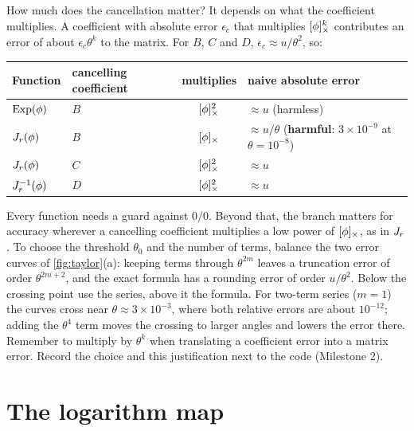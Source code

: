 How much does the cancellation matter? It depends on what the coefficient multiplies. A coefficient
with absolute error $\epsilon_c$ that multiplies $[\phi]_{\times}^k$ contributes an error of about
$\epsilon_c\theta^k$ to the matrix. For $B$, $C$ and $D$, $\epsilon_c \approx u/\theta^2$, so:
\begin{center}\small
\begin{tabular}{@{}l l c l@{}}
\toprule
Function & cancelling coefficient & multiplies & naive absolute error \\
\midrule
$\operatorname{Exp}(\phi)$ & $B$ & $[\phi]_{\times}^2$ & $\approx u$ \quad (harmless) \\
$J_r(\phi)$ & $B$ & $[\phi]_{\times}$ & $\approx u/\theta$ \quad (\textbf{harmful}: $3\times10^{-9}$ at $\theta = 10^{-8}$) \\
$J_r(\phi)$ & $C$ & $[\phi]_{\times}^2$ & $\approx u$ \\
$J_r^{-1}(\phi)$ & $D$ & $[\phi]_{\times}^2$ & $\approx u$ \\
\bottomrule
\end{tabular}
\end{center}

\begin{keyidea}
Every function needs a guard against $0/0$. Beyond that, the branch matters for accuracy wherever a
cancelling coefficient multiplies a low power of $[\phi]_{\times}$, as in $J_r$. To choose the threshold
$\theta_0$ and the number of terms, balance the two error curves of \cref{fig:taylor}(a): keeping terms
through $\theta^{2m}$ leaves a truncation error of order $\theta^{2m+2}$, and the exact formula has a
rounding error of order $u/\theta^2$. Below the crossing point use the series, above it the formula.
For two-term series ($m = 1$) the curves cross near $\theta \approx 3\times10^{-3}$, where both relative
errors are about $10^{-12}$; adding the $\theta^4$ term moves the crossing to larger angles and lowers
the error there. Remember to multiply by $\theta^k$ when translating a coefficient error into a matrix
error. Record the choice and this justification next to the code (Milestone 2).
\end{keyidea}

\section{The logarithm map}
\label{sec:log}

